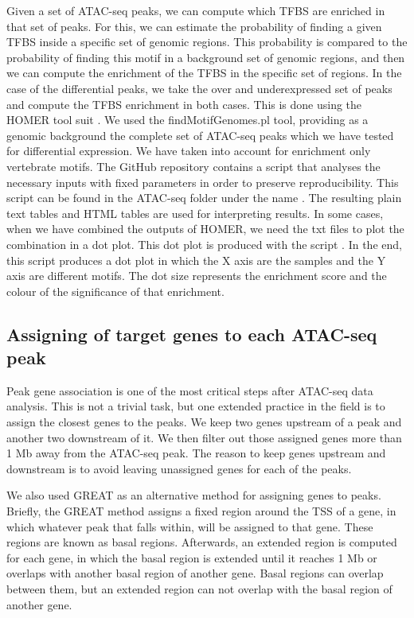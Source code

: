 Given a set of ATAC-seq peaks, we can compute which TFBS are enriched in that set of peaks. For this, we can estimate the probability of finding a given TFBS inside a specific set of genomic regions. This probability is compared to the probability of finding this motif in a background set of genomic regions, and then we can compute the enrichment of the TFBS in the specific set of regions. In the case of the differential peaks, we take the over and underexpressed set of peaks and compute the TFBS enrichment in both cases. This is done using the HOMER tool suit \parencite{heinz_simple_2010}. We used the findMotifGenomes.pl tool, providing as a genomic background the complete set of ATAC-seq peaks which we have tested for differential expression. We have taken into account for enrichment only vertebrate motifs. The GitHub repository contains a script that analyses the necessary inputs with fixed parameters in order to preserve reproducibility. This script can be found in the ATAC-seq folder under the name . The resulting plain text tables and HTML tables are used for interpreting results. In some cases, when we have combined the outputs of HOMER, we need the txt files to plot the combination in a dot plot. This dot plot is produced with the script . In the end, this script produces a dot plot in which the X axis are the samples and the Y axis are different motifs. The dot size represents the enrichment score and the colour of the significance of that enrichment.

\subsection{Assigning of target genes to each ATAC-seq peak}

Peak gene association is one of the most critical steps after ATAC-seq data analysis. This is not a trivial task, but one extended practice in the field is to assign the closest genes to the peaks. We keep two genes upstream of a peak and another two downstream of it. We then filter out those assigned genes more than 1 Mb away from the ATAC-seq peak. The reason to keep genes upstream and downstream is to avoid leaving unassigned genes for each of the peaks. 

We also used GREAT \parencite{mclean_great_2010} as an alternative method for assigning genes to peaks. Briefly, the GREAT method assigns a fixed region around the TSS of a gene, in which whatever peak that falls within, will be assigned to that gene. These regions are known as basal regions. Afterwards, an extended region is computed for each gene, in which the basal region is extended until it reaches 1 Mb or overlaps with another basal region of another gene. Basal regions can overlap between them, but an extended region can not overlap with the basal region of another gene. 

